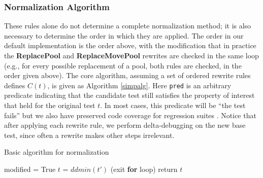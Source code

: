 \subsubsection{Normalization Algorithm}
\label{formalexample}

These rules alone do not determine a complete normalization method; it is
also necessary to determine the order in which they are applied.  The
order in our default implementation is the order above, with the
modification that in practice the {\bf ReplacePool} and {\bf
  ReplaceMovePool} rewrites are checked in the same loop
(e.g., for every possible replacement of a pool, both rules are
checked, in the order given above).  The core algorithm, assuming a set
of ordered rewrite rules defines $C(t)$, is given as Algorithm
\ref{simpalg}.  Here {\tt pred} is an arbitrary predicate indicating
that the candidate test still satisfies the property of interest that
held for the original test $t$.  In most cases, this predicate will be
``the test fails'' but we also have preserved
code coverage for regression suites \cite{icst2014}.  Notice that
after applying each rewrite rule, we perform delta-debugging on the
new base test, since often a rewrite makes other steps irrelevant.

\begin{algorithm}
\caption{Basic algorithm for normalization}
\label{simpalg}
\begin{algorithmic}[1]
\State modified = True 
\State $t$ = $ddmin(t')$
 (exit {\bf for} loop) 
\EndIf 
\EndFor 
\EndWhile 
\State return $t$
\end{algorithmic}
\end{algorithm}

